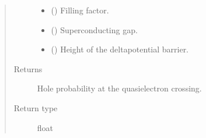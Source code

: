 \documentclass[letterpaper,10pt,english]{sphinxmanual}
\begin{document}
\begin{fulllineitems}
\begin{quote}
\begin{description}
\begin{itemize}
\item {} 
\sphinxAtStartPar
{} () \textendash{} Filling factor.

\item {} 
\sphinxAtStartPar
{} () \textendash{} Superconducting gap.

\item {} 
\sphinxAtStartPar
{} () \textendash{} Height of the delta\sphinxhyphen{}potential barrier.

\end{itemize}

\item[{Returns}] \leavevmode
\sphinxAtStartPar
Hole probability at the quasi\sphinxhyphen{}electron crossing.

\item[{Return type}] \leavevmode
\sphinxAtStartPar
float

\end{description}\end{quote}

\end{fulllineitems}

\end{document}
